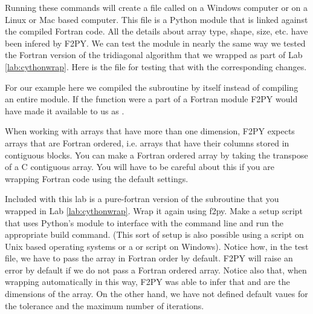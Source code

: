 Running these commands will create a file called  on a Windows computer or  on a Linux or Mac based computer.
This file is a Python module that is linked against the compiled Fortran code.
All the details about array type, shape, size, etc. have been infered by F2PY.
We can test the module in nearly the same way we tested the Fortran version of the tridiagonal algorithm that we wrapped as part of Lab \ref{lab:cythonwrap}.
Here is the file for testing that with the corresponding changes.

\begin{info}
For our example here we compiled the subroutine by itself instead of compiling an entire module.
If the function were a part of a Fortran module  F2PY would have made it available to us as .
\end{info}

\begin{warn}
When working with arrays that have more than one dimension, F2PY expects arrays that are Fortran ordered, i.e. arrays that have their columns stored in contiguous blocks.
You can make a Fortran ordered array by taking the transpose of a C contiguous array.
You will have to be careful about this if you are wrapping Fortran code using the default settings.
\end{warn}

\begin{problem}
Included with this lab is a pure-fortran version of the  subroutine that you wrapped in Lab \ref{lab:cythonwrap}.
Wrap it again using f2py.
Make a setup script that uses Python's  module to interface with the command line and run the appropriate build command.
(This sort of setup is also possible using a  script on Unix based operating systems or a  or  script on Windows).
Notice how, in the test file, we have to pass the array in Fortran order by default.
F2PY will raise an error by default if we do not pass a Fortran ordered array.
Notice also that, when wrapping automatically in this way, F2PY was able to infer that  and  are the dimensions of the array.
On the other hand, we have not defined default vaues for the tolerance and the maximum number of iterations.
\end{problem}

